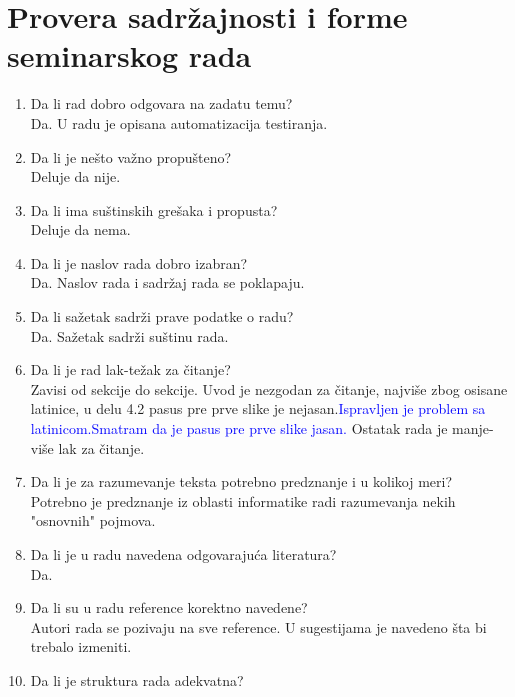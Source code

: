 \documentclass[a4paper]{report}
\newcommand{\odgovor}[1]{\textcolor{blue}{#1}}
\begin{document}
\section{Provera sadržajnosti i forme seminarskog rada}

\begin{enumerate}
\item Da li rad dobro odgovara na zadatu temu?\\
Da. U radu je opisana automatizacija testiranja.\\
\item Da li je nešto važno propušteno?\\
Deluje da nije.\\
\item Da li ima suštinskih grešaka i propusta?\\
Deluje da nema.\\
\item Da li je naslov rada dobro izabran?\\
Da. Naslov rada i sadržaj rada se poklapaju.\\
\item Da li sažetak sadrži prave podatke o radu?\\
Da. Sažetak sadrži suštinu rada.\\
\item Da li je rad lak-težak za čitanje?\\
Zavisi od sekcije do sekcije. Uvod je nezgodan za čitanje, najviše zbog osisane latinice, u delu 4.2 pasus pre prve slike je nejasan.\odgovor{Ispravljen je problem sa latinicom.Smatram da je pasus pre prve slike jasan.} Ostatak rada je manje-više lak za čitanje.\\
\item Da li je za razumevanje teksta potrebno predznanje i u kolikoj meri?\\
Potrebno je predznanje iz oblasti informatike radi razumevanja nekih "osnovnih" pojmova.\\
\item Da li je u radu navedena odgovarajuća literatura?\\
Da.\\
\item Da li su u radu reference korektno navedene?\\
Autori rada se pozivaju na sve reference. U sugestijama je navedeno šta bi trebalo izmeniti.\\
\item Da li je struktura rada adekvatna?\\

\end{enumerate}
\end{document}
